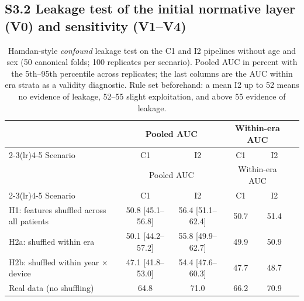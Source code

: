 \subsection*{S3.2 Leakage test of the initial normative layer (V0) and sensitivity (V1--V4)}

{\scriptsize
\setlength{\tabcolsep}{3pt}
\begin{longtable}{p{}ccccc}
\caption{Hamdan-style \textit{confound} leakage test on the C1 and I2 pipelines without age and sex (50 canonical folds; 100 replicates per scenario). Pooled AUC in percent with the 5th--95th percentile across replicates; the last columns are the AUC within era strata as a validity diagnostic. Rule set beforehand: a mean I2 up to 52 means no evidence of leakage, 52--55 slight exploitation, and above 55 evidence of leakage.}\label{tab:hamdan}\\
\toprule
 & \multicolumn{2}{c}{Pooled AUC} & \multicolumn{2}{c}{Within-era AUC} \\
\cmidrule(lr){2-3}\cmidrule(lr){4-5}
Scenario & C1 & I2 & C1 & I2 \\
\midrule
\endfirsthead
\toprule
 & \multicolumn{2}{c}{Pooled AUC} & \multicolumn{2}{c}{Within-era AUC} \\
\cmidrule(lr){2-3}\cmidrule(lr){4-5}
Scenario & C1 & I2 & C1 & I2 \\
\midrule
\endhead
\bottomrule
\endfoot
H1: features shuffled across all patients & 50.8 [45.1--56.8] & 56.4 [51.1--62.4] & 50.7 & 51.4 \\
H2a: shuffled within era & 50.1 [44.2--57.2] & 55.8 [49.9--62.7] & 49.9 & 50.9 \\
H2b: shuffled within year $\times$ device & 47.1 [41.8--53.0] & 54.4 [47.6--60.3] & 47.7 & 48.7 \\
Real data (no shuffling) & 64.8 & 71.0 & 66.2 & 70.9 \\
\end{longtable}
}

